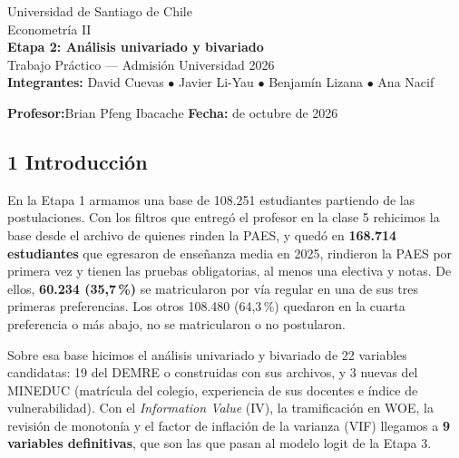 \documentclass[11pt]{article}
\begin{document}
\sloppy

\begin{titlepage}
\centering
\vspace*{3cm}
{\large Universidad de Santiago de Chile}\\[6pt]
{\large Econometría II}\\[2cm]
{\LARGE \textbf{Etapa 2: Análisis univariado y bivariado}}\\[10pt]
{\large Trabajo Práctico --- Admisión Universidad 2026}\\[3cm]

\textbf{Integrantes:}\quad
David Cuevas $\bullet$ Javier Li-Yau $\bullet$ Benjamín Lizana $\bullet$ Ana Nacif

\vspace{0.6cm}

\textbf{Profesor:}\quad Brian Pfeng Ibacache
\qquad
\textbf{Fecha:} de octubre de 2026
\end{titlepage}

\subsection*{1 \; Introducción}

En la Etapa 1 armamos una base de 108.251 estudiantes partiendo de las
postulaciones. Con los filtros que entregó el profesor en la clase 5
rehicimos la base desde el archivo de quienes rinden la PAES, y quedó en
\textbf{168.714 estudiantes} que egresaron de enseñanza media en 2025,
rindieron la PAES por primera vez y tienen las pruebas obligatorias, al
menos una electiva y notas. De ellos, \textbf{60.234 (35,7\,\%)} se
matricularon por vía regular en una de sus tres primeras preferencias. Los
otros 108.480 (64,3\,\%) quedaron en la cuarta preferencia o más abajo, no
se matricularon o no postularon.

Sobre esa base hicimos el análisis univariado y bivariado de 22 variables
candidatas: 19 del DEMRE o construidas con sus archivos, y 3 nuevas del
MINEDUC (matrícula del colegio, experiencia de sus docentes e índice de
vulnerabilidad). Con el \textit{Information Value} (IV), la
tramificación en WOE, la revisión de monotonía y el factor de inflación de
la varianza (VIF) llegamos a \textbf{9 variables definitivas}, que son las
que pasan al modelo logit de la Etapa 3.
\end{document}
